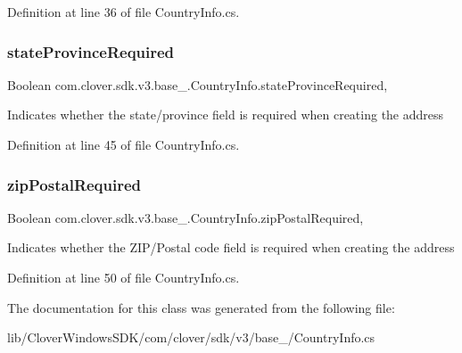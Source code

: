 Definition at line 36 of file Country\+Info.\+cs.

\mbox{\label{classcom_1_1clover_1_1sdk_1_1v3_1_1base___1_1_country_info_a2faf9d387822900e0e9c6f21554712bd}} 
\subsubsection{\texorpdfstring{state\+Province\+Required}{stateProvinceRequired}}
{\footnotesize\ttfamily Boolean com.\+clover.\+sdk.\+v3.\+base\+\_\+.\+Country\+Info.\+state\+Province\+Required\hspace{0.3cm}{\ttfamily [get]}, {\ttfamily [set]}}



Indicates whether the state/province field is required when creating the address 



Definition at line 45 of file Country\+Info.\+cs.

\mbox{\label{classcom_1_1clover_1_1sdk_1_1v3_1_1base___1_1_country_info_af540420a76db1fa9ba7858fb62d35f8e}} 
\subsubsection{\texorpdfstring{zip\+Postal\+Required}{zipPostalRequired}}
{\footnotesize\ttfamily Boolean com.\+clover.\+sdk.\+v3.\+base\+\_\+.\+Country\+Info.\+zip\+Postal\+Required\hspace{0.3cm}{\ttfamily [get]}, {\ttfamily [set]}}



Indicates whether the Z\+I\+P/\+Postal code field is required when creating the address 



Definition at line 50 of file Country\+Info.\+cs.



The documentation for this class was generated from the following file\+:\begin{DoxyCompactItemize}
\item 
lib/\+Clover\+Windows\+S\+D\+K/com/clover/sdk/v3/base\+\_\+/Country\+Info.\+cs\end{DoxyCompactItemize}
